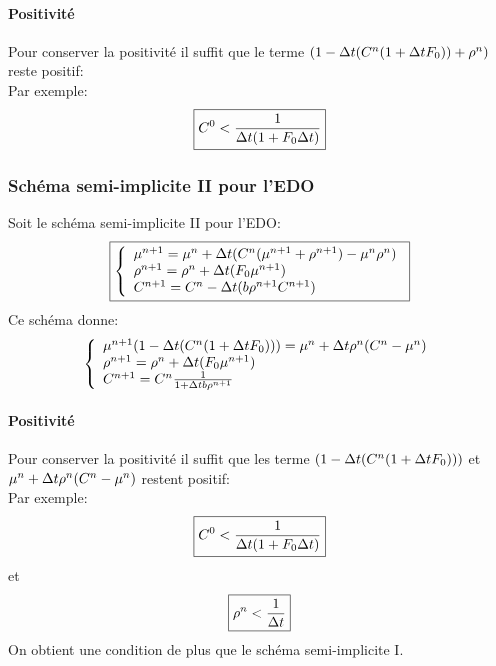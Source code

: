 \paragraph{Positivité}
Pour conserver la positivité il suffit que le terme $(1-\Delta t(C^{n}(1+\Delta t F_0)) + \rho^{n}) $ reste positif:\\
Par exemple: 
\begin{equation}
	\boxed{C^0< \frac{1}{\Delta t(1+F_0\Delta t)}}
\end{equation}

\subsubsection{Schéma semi-implicite II pour l'EDO}
Soit le schéma semi-implicite II pour l'EDO:
\begin{equation} \boxed{\left\{
                \begin{array}{ll}
                   \mu^{n+1} = \mu^{n}+  \Delta t( C^{n}(\mu^{n+1} + \rho^{n+1}) -\mu^{n}\rho^{n})\\
                \rho^{n+1}=  \rho^{n}+ \Delta t (F_0 \mu^{n+1}) \\
                 C^{n+1} =C^{n}- \Delta t(b\rho^{n+1}C^{n+1})
                \end{array}
              \right.}
\end{equation}
Ce schéma donne:
\begin{equation*} \left\{
                \begin{array}{ll}
                   \mu^{n+1}(1-\Delta t(C^{n}(1+\Delta t F_0))) = \mu^{n}+  \Delta t \rho^{n}(C^{n}-\mu^{n}) \\
                \rho^{n+1}=  \rho^{n}+ \Delta t (F_0 \mu^{n+1}) \\
                 C^{n+1} =C^{n}\frac{1}{1+ \Delta t b\rho^{n+1}}
                \end{array}
              \right.
\end{equation*}
\paragraph{Positivité}
Pour conserver la positivité il suffit que les terme $(1-\Delta t(C^{n}(1+\Delta t F_0)))$ et $\mu^{n}+  \Delta t \rho^{n}(C^{n}-\mu^{n})$ restent positif:\\
Par exemple: 
\begin{equation}
	\boxed{C^0< \frac{1}{\Delta t(1+F_0\Delta t)}}
\end{equation}
et 
\begin{equation}
	\boxed{\rho^n< \frac{1}{\Delta t}}
\end{equation}
On obtient une condition de plus que le schéma semi-implicite I.
